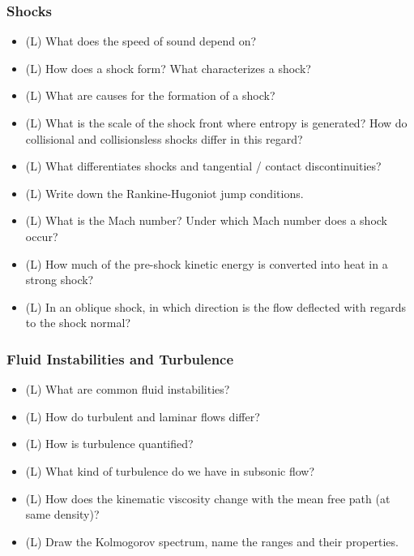 \subsubsection*{Shocks}
\begin{itemize}
    \item (L) What does the speed of sound depend on?
    \answerboxS
    \item (L) How does a shock form? What characterizes a shock?
    \answerboxM
    \item (L) What are causes for the formation of a shock?
    \answerboxM
    \item (L) What is the scale of the shock front where entropy is generated? How do collisional
    and collisionsless shocks differ in this regard?
    \answerboxS
    \item (L) What differentiates shocks and tangential / contact discontinuities?
    \answerboxM
    \item (L) Write down the Rankine-Hugoniot jump conditions.
    \answerboxM
    \item (L) What is the Mach number? Under which Mach number does a shock occur?
    \answerboxS
    \item (L) How much of the pre-shock kinetic energy is converted into heat in a strong shock?
    \answerboxS
    \item (L) In an oblique shock, in which direction is the flow deflected with regards to the shock normal?
    \answerboxS
\end{itemize}

\subsubsection*{Fluid Instabilities and Turbulence}
\begin{itemize}
    \item (L) What are common fluid instabilities?
    \answerboxM
    \item (L) How do turbulent and laminar flows differ?
    \answerboxS
    \item (L) How is turbulence quantified?
    \answerboxS
    \item (L) What kind of turbulence do we have in subsonic flow?
    \answerboxS
    \item (L) How does the kinematic viscosity change with the mean free path (at same density)?
    \answerboxS
    \item (L) Draw the Kolmogorov spectrum, name the ranges and their properties.
    \answerboxM
\end{itemize}

